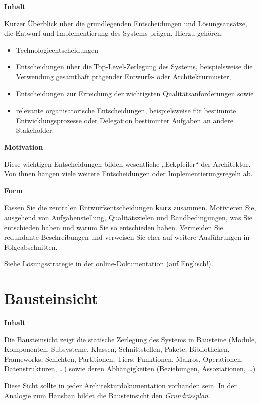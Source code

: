 \documentclass[
]{article}
\begin{document}
\textbf{Inhalt}

Kurzer Überblick über die grundlegenden Entscheidungen und
Lösungsansätze, die Entwurf und Implementierung des Systems prägen.
Hierzu gehören:

\begin{itemize}
\item
  Technologieentscheidungen
\item
  Entscheidungen über die Top-Level-Zerlegung des Systems,
  beispielsweise die Verwendung gesamthaft prägender Entwurfs- oder
  Architekturmuster,
\item
  Entscheidungen zur Erreichung der wichtigsten Qualitätsanforderungen
  sowie
\item
  relevante organisatorische Entscheidungen, beispielsweise für
  bestimmte Entwicklungsprozesse oder Delegation bestimmter Aufgaben an
  andere Stakeholder.
\end{itemize}

\textbf{Motivation}

Diese wichtigen Entscheidungen bilden wesentliche „Eckpfeiler`` der
Architektur. Von ihnen hängen viele weitere Entscheidungen oder
Implementierungsregeln ab.

\textbf{Form}

Fassen Sie die zentralen Entwurfsentscheidungen \textbf{kurz} zusammen.
Motivieren Sie, ausgehend von Aufgabenstellung, Qualitätszielen und
Randbedingungen, was Sie entschieden haben und warum Sie so entschieden
haben. Vermeiden Sie redundante Beschreibungen und verweisen Sie eher
auf weitere Ausführungen in Folgeabschnitten.

Siehe \href{https://docs.arc42.org/section-4/}{Lösungsstrategie} in der
online-Dokumentation (auf Englisch!).

\hypertarget{section-building-block-view}{%
\section{Bausteinsicht}\label{section-building-block-view}}

\textbf{Inhalt}

Die Bausteinsicht zeigt die statische Zerlegung des Systems in Bausteine
(Module, Komponenten, Subsysteme, Klassen, Schnittstellen, Pakete,
Bibliotheken, Frameworks, Schichten, Partitionen, Tiers, Funktionen,
Makros, Operationen, Datenstrukturen, \ldots) sowie deren Abhängigkeiten
(Beziehungen, Assoziationen, \ldots)

Diese Sicht sollte in jeder Architekturdokumentation vorhanden sein. In
der Analogie zum Hausbau bildet die Bausteinsicht den
\emph{Grundrissplan}.
\end{document}
